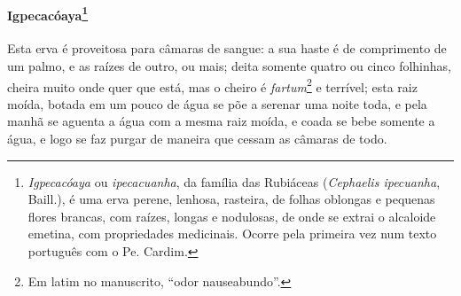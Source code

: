 \paragraph{Igpecacóaya\footnote{ \textit{Igpecacóaya} ou \textit{
ipecacuanha}, da família das Rubiáceas (\textit{Cephaelis ipecuanha}, Baill.),
é uma erva perene, lenhosa, rasteira, de
folhas oblongas e pequenas flores brancas, com raízes, longas e
nodulosas, de onde se extrai o alcaloide emetina, com propriedades
medicinais. Ocorre pela primeira vez num texto português com o Pe.
Cardim.}} Esta erva é proveitosa para câmaras de sangue: a
sua haste é de comprimento de um palmo, e as raízes de outro, ou mais;
deita somente quatro ou cinco folhinhas, cheira muito onde quer que
está, mas o cheiro é \textit{fartum}\footnote{ Em latim no manuscrito, ``odor nauseabundo''.} e
terrível; esta raiz moída, botada em um pouco de água se põe a serenar
uma noite toda, e pela manhã se aguenta a água com a mesma raiz moída,
e coada se bebe somente a água, e logo se faz purgar de maneira que
cessam as câmaras de todo.

